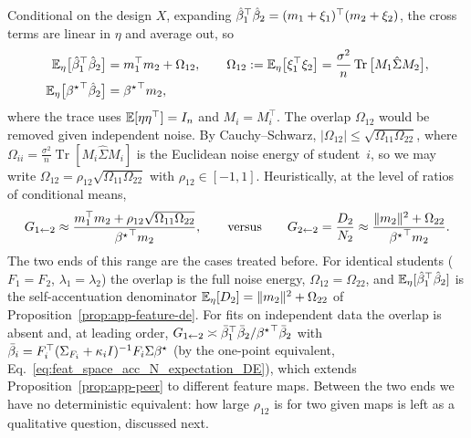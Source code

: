 {Conditional on the design $X$, expanding
${\hat{\beta}_1}^\top\hat{\beta}_2=(m_1+\xi_1)^\top(m_2+\xi_2)$, the
cross terms are linear in $\eta$ and average out, so
\begin{align}
\mathbb{E}_\eta\big[{\hat{\beta}_1}^\top\hat{\beta}_2\big]&=m_1^\top m_2+\Omega_{12},
\qquad
\Omega_{12}:=\mathbb{E}_\eta\big[\xi_1^\top\xi_2\big]=\frac{\sigma^2}{n}\operatorname{Tr}\big[M_1\hat\Sigma M_2\big],
\\
\mathbb{E}_\eta\big[{{\beta^{\star}}}^\top\hat{\beta}_2\big]&={{\beta^{\star}}}^\top m_2 ,
\label{eq:app-shared-cross}
\end{align}
where the trace uses $\mathbb{E}[\eta\eta^\top]=I_n$ and $M_i=M_i^\top$.  The
overlap $\Omega_{12}$ would be removed given independent noise.  
By Cauchy--Schwarz, $|\Omega_{12}|\le\sqrt{\Omega_{11}\Omega_{22}}$, where
$\Omega_{ii}=\frac{\sigma^2}{n}\operatorname{Tr}[M_i\hat\Sigma M_i]$ is the
Euclidean noise energy of student~$i$, so we may write
$\Omega_{12}=\rho_{12}\sqrt{\Omega_{11}\Omega_{22}}$ with
$\rho_{12}\in[-1,1]$.  Heuristically, at the level of ratios of conditional
means,
\begin{equation}
G_{1\leftarrow2}\approx\frac{m_1^\top m_2+\rho_{12}\sqrt{\Omega_{11}\Omega_{22}}}{{{\beta^{\star}}}^\top m_2},
\qquad\text{versus}\qquad
G_{2\leftarrow2}=\frac{D_2}{N_2}\approx\frac{\|m_2\|^2+\Omega_{22}}{{{\beta^{\star}}}^\top m_2}.
\label{eq:app-shared-gain}
\end{equation}
The two ends of this range are the cases treated before.  For identical
students ($F_1=F_2$, $\lambda_1=\lambda_2$) the overlap is the full noise
energy, $\Omega_{12}=\Omega_{22}$, and $\mathbb{E}_\eta[{\hat{\beta}_1}^\top\hat{\beta}_2]$ is
the self-accentuation denominator $\mathbb{E}_\eta[D_2]=\|m_2\|^2+\Omega_{22}$ of
Proposition~\ref{prop:app-feature-de}.  For fits on independent data the
overlap is absent and, at leading order,
$G_{1\leftarrow2}\asymp\bar\beta_1^\top\bar\beta_2/{{\beta^{\star}}}^\top\bar\beta_2$
with $\bar\beta_i=F_i^\top(\Sigma_{F_i}+\kappa_iI)^{-1}F_i\Sigma{\beta^{\star}}$
(by the one-point equivalent, Eq.~\ref{eq:feat_space_acc_N_expectation_DE}),
which extends Proposition~\ref{prop:app-peer} to different feature maps.
Between the two ends we have no deterministic equivalent: how large
$\rho_{12}$ is for two given maps is left as a qualitative question, discussed
next.}
